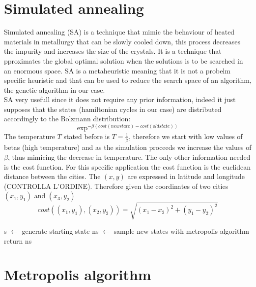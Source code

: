 \documentclass{article}
\begin{document}
\section{Simulated annealing}
Simulated annealing (SA) is a technique that mimic the behaviour of heated materials in metallurgy that can be slowly cooled down, this process decreases the impurity and increases the size of the crystals. It is a technique that pproximates the global optimal solution when the solutions is to be searched in an enormous space. SA is a metaheuristic meaning that it is not a probelm specific heuristic and that can be used to reduce the search space of an algorithm, the genetic algorithm in our case.\\
SA very usefull since it does not require any prior information, indeed it just supposes that the states (hamiltonian cycles in our case) are distributed accordingly to the Bolzmann distribution:
\begin{equation}
\exp^{- \beta (cost(new state) - cost(old state))}
\end{equation}
The temperature $T$ stated before is $T = \frac{1}{\beta}$, therefore we start with low values of betas (high temperature) and as the simulation proceeds we increase the values of $\beta$, thus mimicing the decrease in temperature.
The only other information needed is the cost function. For this specific application the cost function is the euclidean distance between the cities. The $(x,y)$ are expressed in latitude and longitude (CONTROLLA L'ORDINE). Therefore given the coordinates of two cities  $(x_1,y_1)$ and $(x_3,y_2)$
\begin{equation}
cost((x_1,y_1),(x_2,y_2)) = \sqrt{(x_1-x_2)^2 + (y_1-y_2)^2}
\end{equation}

\begin{algorithm}[h]
    \begin{algorithmic}[1]
        \State s $\leftarrow$ generate starting state
         	\State ns  $\leftarrow$ sample new states with metropolis algorithm
         	\EndFor
        \EndFor
        \State return ns
       \EndFunction
\end{algorithmic}
\end{algorithm}

\section{Metropolis algorithm}
\end{document}
